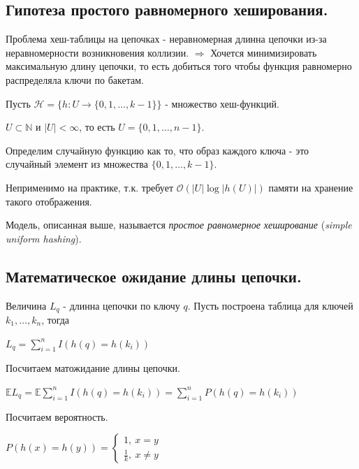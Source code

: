 \subsection*{Гипотеза простого равномерного хеширования.}

Проблема хеш-таблицы на цепочках - неравномерная длинна цепочки из-за неравномерности возникновения коллизии. $\Rightarrow$ Хочется минимизировать максимальную длину цепочки, то есть добиться того чтобы функция равномерно распределяла ключи по бакетам.

Пусть $\mathcal{H} = \{h:U \rightarrow \{0, 1, \dots, k - 1\} \}$ - множество хеш-функций.

\Note $U \subset \mathbb{N}$ и $|U| < \infty$, то есть $U = \{0, 1, \dots, n - 1\}$.

Определим случайную функцию как то, что образ каждого ключа - это случайный элемент из множества $\{0, 1, \dots, k - 1\}$.

\Note Неприменимо на практике, т.к. требует $\mathcal{O}(|U|\log|h(U)|)$ памяти на хранение такого отображения.

\Def Модель, описанная выше, называется \textit{простое равномерное хеширование} (\textit{simple uniform hashing}).

\subsection*{Математическое ожидание длины цепочки.}

Величина $L_q$ - длинна цепочки по ключу $q$.\newline
Пусть построена таблица для ключей $k_1, \dots, k_n$, тогда 

\begin{center}
{\large $L_q = \sum\limits_{i = 1}^{n} I(h(q) = h(k_i))$}
\end{center}

Посчитаем матожидание длины цепочки.

\begin{center}
{\large $\mathbb{E} L_q = \mathbb{E}\sum\limits_{i = 1}^{n} I(h(q) = h(k_i)) = \sum\limits_{i = 1}^{n} P(h(q) = h(k_i))$}
\end{center}

Посчитаем вероятность.

\begin{center}
    {\large $ P(h(x) = h(y)) =
        \begin{cases}
        1, \ x = y\\
        \frac{1}{k}, \ x \neq y 
    \end{cases} $}
\end{center}

